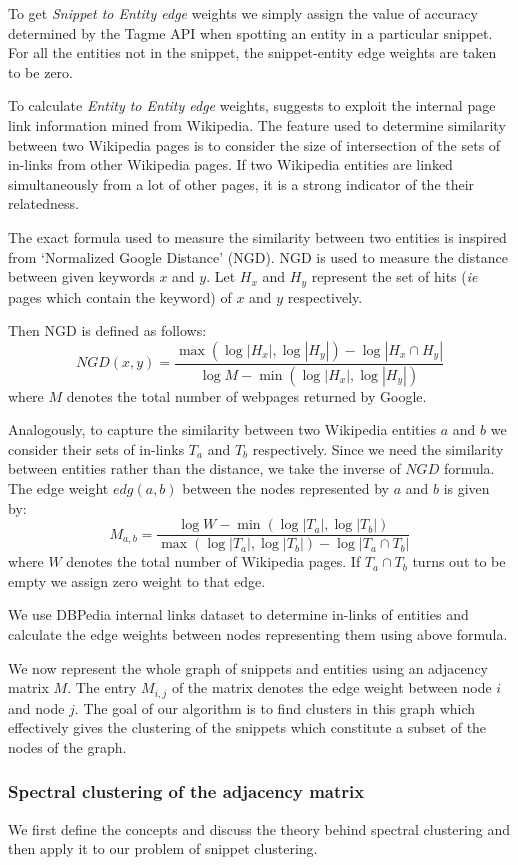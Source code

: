 \documentclass[a4paper,12pt]{report}
\begin{document}
To get {\it Snippet to Entity edge} weights we simply assign the value
of accuracy determined by the Tagme API when spotting an entity in a
particular snippet. For all the entities not in the snippet, the
snippet-entity edge weights are taken to be zero.

To calculate {\it Entity to Entity edge} weights, \cite{Ferragina}
suggests to exploit the internal page link information mined from
Wikipedia. The feature used to determine similarity between two
Wikipedia pages is to consider the size of intersection of the sets of
in-links from other Wikipedia pages. If two Wikipedia entities are
linked simultaneously from a lot of other pages, it is a strong
indicator of the their relatedness.

The exact formula used to measure the similarity between two entities
is inspired from `Normalized Google Distance' (NGD). NGD is used to
measure the distance between given keywords $x$ and $y$. Let $H_x$ and
$H_y$ represent the set of hits ({\it ie} pages which contain the
keyword) of $x$ and $y$ respectively.

Then NGD is defined as follows:
$$
 NGD(x, y) = \frac{\max(\log |H_x|,\log |H_y|) - \log |H_x \cap H_y|}{
   \log M - \min(\log |H_x|, \log |H_y|)}
$$
where $M$ denotes the total number of webpages returned by Google.

Analogously, to capture the similarity between two Wikipedia entities
$a$ and $b$ we consider their sets of in-links $T_a$ and $T_b$
respectively. Since we need the similarity between entities rather
than the distance, we take the inverse of $NGD$ formula. The edge
weight $edg(a,b)$ between the nodes represented by $a$ and $b$ is
given by:
$$ 
M_{a,b} = \frac{\log W - \min(\log |T_a|, \log |T_b|)}{\max(\log
  |T_a|,\log |T_b|) - \log |T_a \cap T_b|}
$$
where $W$ denotes the total number of Wikipedia pages. If $T_a \cap
T_b$ turns out to be empty we assign zero weight to that edge.

We use DBPedia internal links dataset to determine in-links of
entities and calculate the edge weights between nodes representing
them using above formula.

We now represent the whole graph of snippets and entities using an
adjacency matrix $M$. The entry $M_{i,j}$ of the matrix denotes the
edge weight between node $i$ and node $j$. The goal of our algorithm
is to find clusters in this graph which effectively gives the
clustering of the snippets which constitute a subset of the nodes of
the graph.
 
\subsubsection{Spectral clustering of the adjacency matrix}
We first define the concepts and discuss the theory behind spectral
clustering and then apply it to our problem of snippet clustering.
\end{document}
